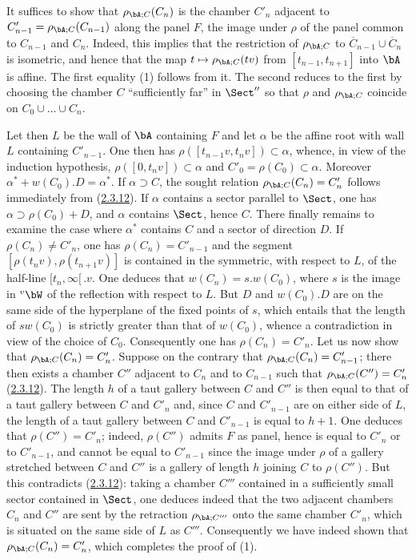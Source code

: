 \documentclass[12pt,a4paper,oneside,english]{smfart}
\makeatletter
\newcommand{\btpageanchor}[1]{\Hy@raisedlink{\hypertarget{p:#1}{}}}
\newcommand{\btref}[1]{\hyperlink{bt:#1}{#1}}
\newcommand{\btpage}[1]{\marginnote{p.~#1}\btpageanchor{#1}}
\newcommand{\pagemark}[1]{\btpage{#1}}
\theoremstyle{definition}
\theoremstyle{bt}
\makeatother
\begin{document}
It suffices to show that $\rho_{\bA;C}(C_n)$ is the chamber $C'_n$ adjacent to
$C'_{n-1}=\rho_{\bA;C}(C_{n-1})$ along the panel $F$, the image under $\rho$
of the panel common to $C_{n-1}$ and $C_n$. Indeed, this implies that the
restriction of $\rho_{\bA;C}$ to $\overline{C}_{n-1}\cup\overline{C}_n$ is
isometric, and hence that the map $t\mapsto\rho_{\bA;C}(tv)$ from
$[t_{n-1},t_{n+1}]$ into $\bA$ is affine. The first equality (1) follows from
it. The second reduces to the first by choosing the chamber $C$ ``sufficiently
far'' in $\Sect''$ so that $\rho$ and $\rho_{\bA;C}$ coincide on
$C_0\cup\dots\cup C_n$.

Let then $L$ be the wall of $\bA$ containing $F$ and let $\alpha$ be the
affine root with wall $L$ containing $C'_{n-1}$. One then has
$\rho([t_{n-1}v,t_nv])\subset\alpha$, whence, in view of the induction
hypothesis, $\rho([0,t_nv])\subset\alpha$ and
$C'_0=\rho(C_0)\subset\alpha$. Moreover $\alpha^{*}+w(C_0).D=\alpha^{*}$. If
$\alpha\supset C$, the sought relation $\rho_{\bA;C}(C_n)=C'_n$ follows
immediately from (\btref{2.3.12}). If $\alpha$ contains a sector parallel to $\Sect$,
one has $\alpha\supset\rho(C_0)+D$, and $\alpha$ contains $\Sect$, hence $C$.
There finally remains to examine the case where $\alpha^{*}$ contains $C$ and
a sector of direction $D$. If $\rho(C_n)\neq C'_n$, one has
$\rho(C_n)=C'_{n-1}$ and the segment $[\rho(t_nv),\rho(t_{n+1}v)]$ is
contained in the symmetric, with respect to $L$, of the half-line
$[t_n,\infty[\,.v$. One deduces that $w(C_n)=s.w(C_0)$, where $s$ is the image
in ${}^{v}\bW$ of the reflection with respect to $L$. But $D$ and $w(C_0).D$
are on the same side of the hyperplane of the fixed points of $s$, which
entails that the length of $sw(C_0)$ is strictly greater than that of
$w(C_0)$, whence a contradiction in view of the choice of $C_0$. Consequently
one has $\rho(C_n)=C'_n$. Let us now show that $\rho_{\bA;C}(C_n)=C'_n$.
Suppose on the contrary that $\rho_{\bA;C}(C_n)=C'_{n-1}$; there then exists a
chamber $C''$ adjacent to $C_n$ and to $C_{n-1}$ such that
$\rho_{\bA;C}(C'')=C'_n$ (\btref{2.3.12}). The length $h$ of a taut gallery
between $C$ and $C''$ is then equal to that of a taut gallery between $C$
and $C'_n$ and, since $C$ and $C'_{n-1}$ are on either side of $L$, the length
of a taut gallery between $C$ and $C'_{n-1}$ is equal to $h+1$. One
deduces that $\rho(C'')=C'_n$; indeed,
\pagemark{60}
$\rho(C'')$ admits $F$ as panel, hence is equal to $C'_n$ or to $C'_{n-1}$,
and cannot be equal to $C'_{n-1}$ since the image under $\rho$ of a gallery
stretched between $C$ and $C''$ is a gallery of length $h$ joining $C$ to
$\rho(C'')$. But this contradicts (\btref{2.3.12}): taking a chamber $C'''$ contained
in a sufficiently small sector contained in $\Sect$, one deduces indeed that
the two adjacent chambers $C_n$ and $C''$ are sent by the retraction
$\rho_{\bA;C'''}$ onto the same chamber $C'_n$, which is situated on the same
side of $L$ as $C'''$. Consequently we have indeed shown that
$\rho_{\bA;C}(C_n)=C'_n$, which completes the proof of (1).
\end{document}
